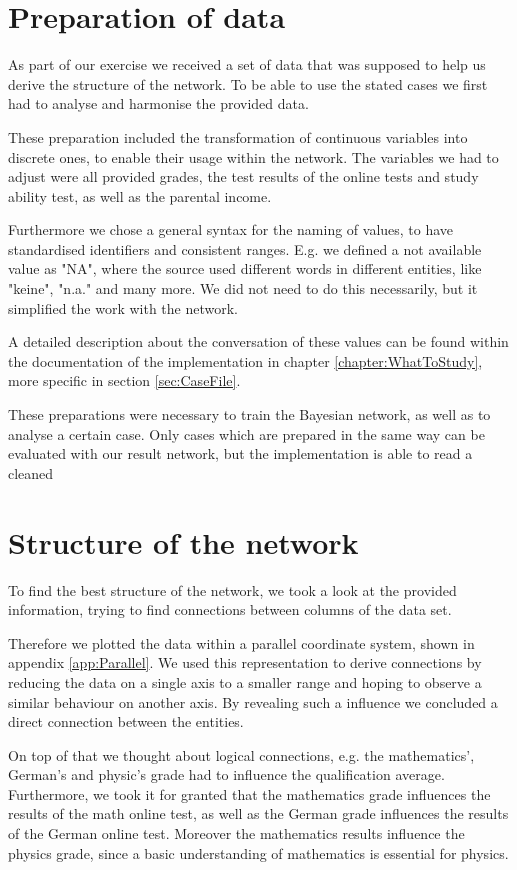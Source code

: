 \documentclass[%
	pdftex,
	oneside,        %
	11pt,           %
	parskip=half,   %
	headsepline,    %
	footsepline,    %
	abstracton,     %
	USenglish,      %
	a4paper,        %
]{report}
\begin{document}
\chapter{Preparation of data}
As part of our exercise we received a set of data that was supposed to help us derive the structure of the network. To be able to use the stated cases we first had to analyse and harmonise the provided data. 

These preparation included the transformation of continuous variables into discrete ones, to enable their usage within the network. The variables we had to adjust were all provided grades, the test results of the online tests and study ability test, as well as the parental income. 

Furthermore we chose a general syntax for the naming of values, to have standardised identifiers and consistent ranges. E.g. we defined a not available value as "NA", where the source used different words in different entities, like "keine", "n.a." and many more. We did not need to do this necessarily, but it simplified the work with the network.

A detailed description about the conversation of these values can be found within the documentation of the implementation in chapter \vref{chapter:WhatToStudy}, more specific in section \vref{sec:CaseFile}.

These preparations were necessary to train the Bayesian network, as well as to analyse a certain case. Only cases which are prepared in the same way can be evaluated with our result network, but the implementation is able to read a cleaned

\chapter{Structure of the network}
To find the best structure of the network, we took a look at the provided information, trying to find connections between columns of the data set. 

Therefore we plotted the data within a parallel coordinate system, shown in appendix \vref{app:Parallel}. We used this representation to derive connections by reducing the data on a single axis to a smaller range and hoping to observe a similar behaviour on another axis. By revealing such a influence we concluded a direct connection between the entities.

On top of that we thought about logical connections, e.g. the mathematics', German's and physic's grade had to influence the qualification average. Furthermore, we took it for granted that the mathematics grade influences the results of the math online test, as well as the German grade influences the results of the German online test. Moreover the mathematics results influence the physics grade, since a basic understanding of mathematics is essential for physics. 
\end{document}
